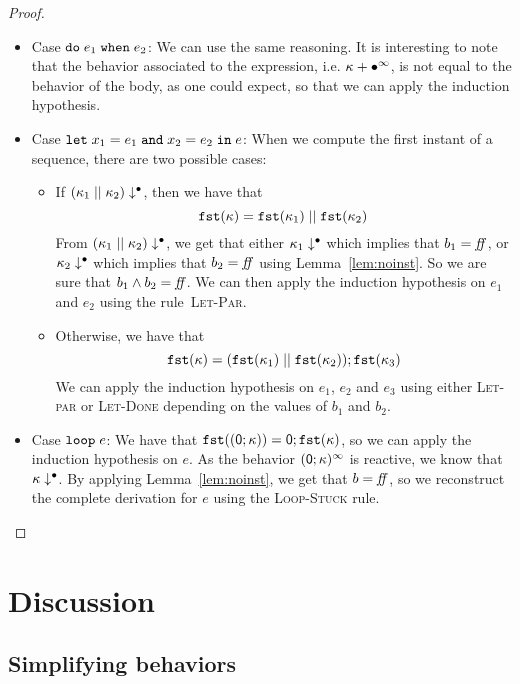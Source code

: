 \documentclass[9pt,preprint]{sigplanconf}
\begin{document}
\begin{proof}
\begin{itemize}
\item Case $\mathtt{do}\; e_1 \;\mathtt{when}\; e_2$: We can use the same reasoning. It is interesting to note that the behavior associated to the expression, i.e. $\kappa + \bullet^\infty$, is not equal to the behavior of the body, as one could expect, so that we can apply the induction hypothesis.

\item Case $\mathtt{let}\; x_1 = e_1 \;\mathtt{and}\; x_2 = e_2 \;\mathtt{in}\; e$:
When we compute the first instant of a sequence, there are two possible cases:
\begin{itemize}
\item If $(\kappa_1 \mid\mid \kappa_2)\downarrow^{\bullet}$, then we have that 
\[  \mathtt{fst}(\kappa) = \mathtt{fst}(\kappa_1) \mid\mid \mathtt{fst}(\kappa_2) \]
From $(\kappa_1 \mid\mid \kappa_2)\downarrow^{\bullet}$, we get that either $\kappa_1\downarrow^{\bullet}$ which implies that $b_1 = \mathit{ff}$, or $\kappa_2\downarrow^{\bullet}$ which implies that $b_2 = \mathit{ff}$ using Lemma~\ref{lem:noinst}. So we are sure that $b_1 \land b_2 = \mathit{ff}$. We can then apply the induction hypothesis on $e_1$ and $e_2$ using the rule~\textsc{Let-Par}.

\item Otherwise, we have that
\[  \mathtt{fst}(\kappa) = (\mathtt{fst}(\kappa_1) \mid\mid \mathtt{fst}(\kappa_2)) ; \mathtt{fst}(\kappa_3) \]
We can apply the induction hypothesis on $e_1$, $e_2$ and $e_3$ using either \textsc{Let-par} or \textsc{Let-Done} depending on the values of $b_1$ and $b_2$.
\end{itemize}

\item Case $\mathtt{loop}\; e$: 
We have that \mbox{$\mathtt{fst}((\textsf{0} ; \kappa)) = \textsf{0} ; \mathtt{fst}(\kappa)$}, so we can apply the induction hypothesis on $e$.
As the behavior $(\textsf{0} ; \kappa)^\infty$ is reactive, we know that $\kappa\downarrow^{\bullet}$. By applying Lemma~\ref{lem:noinst}, we get that $b = \mathit{ff}$, so we reconstruct the complete derivation for $e$ using the \textsc{Loop-Stuck} rule.

\end{itemize}

\end{proof}

\section{Discussion}
\label{sec:discussion}

\subsection{Simplifying behaviors}
\end{document}
